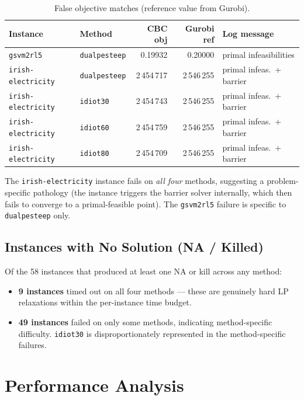 \documentclass[11pt,a4paper]{article}
\begin{document}
\begin{table}[h]
\centering
\caption{False objective matches (reference value from Gurobi).}
\begin{tabular}{llrrl}
\toprule
\textbf{Instance} & \textbf{Method} & \textbf{CBC obj} & \textbf{Gurobi ref} & \textbf{Log message} \\
\midrule
\texttt{gsvm2rl5}         & \texttt{dualpesteep} & 0.19932 & 0.20000 & primal infeasibilities \\
\texttt{irish-electricity}& \texttt{dualpesteep} & 2\,454\,717 & 2\,546\,255 & primal infeas.\ + barrier\\
\texttt{irish-electricity}& \texttt{idiot30}     & 2\,454\,743 & 2\,546\,255 & primal infeas.\ + barrier\\
\texttt{irish-electricity}& \texttt{idiot60}     & 2\,454\,759 & 2\,546\,255 & primal infeas.\ + barrier\\
\texttt{irish-electricity}& \texttt{idiot80}     & 2\,454\,709 & 2\,546\,255 & primal infeas.\ + barrier\\
\bottomrule
\end{tabular}
\end{table}

\noindent The \texttt{irish-electricity} instance fails on \emph{all four} methods,
suggesting a problem-specific pathology (the instance triggers the barrier solver
internally, which then fails to converge to a primal-feasible point). The
\texttt{gsvm2rl5} failure is specific to \texttt{dualpesteep} only.

\subsection{Instances with No Solution (NA / Killed)}
Of the 58 instances that produced at least one NA or kill across any method:
\begin{itemize}
  \item \textbf{9 instances} timed out on all four methods — these are genuinely
        hard LP relaxations within the per-instance time budget.
  \item \textbf{49 instances} failed on only some methods, indicating
        method-specific difficulty. \texttt{idiot30} is disproportionately
        represented in the method-specific failures.
\end{itemize}

\section{Performance Analysis}
\end{document}
